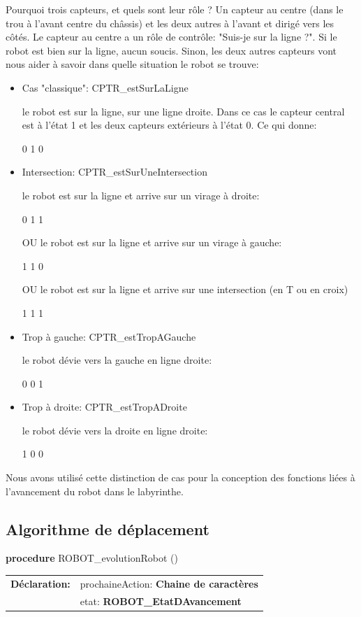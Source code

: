 \documentclass[a4paper,11pt]{article}
\begin{document}
Pourquoi trois capteurs, et quels sont leur rôle ?
Un capteur au centre (dans le trou à l'avant centre du châssis) et les deux autres à l'avant et dirigé vers les côtés.
Le capteur au centre a un rôle de contrôle: "Suis-je sur la ligne ?". Si le robot est bien sur la ligne, aucun soucis.
Sinon, les deux autres capteurs vont nous aider à savoir dans quelle situation le robot se trouve:
\begin{itemize}
    \item Cas "classique": CPTR\_estSurLaLigne
     
    le robot est sur la ligne, sur une ligne droite. Dans ce cas le capteur central est à l'état 1 et les deux capteurs extérieurs à l'état 0. Ce qui donne:

        0   1   0
    \item Intersection: CPTR\_estSurUneIntersection
    
    le robot est sur la ligne et arrive sur un virage à droite:
        
        0   1   1
    
    OU le robot est sur la ligne et arrive sur un virage à gauche:
    
        1   1   0
    
    OU le robot est sur la ligne et arrive sur une intersection (en T ou en croix)
    
        1   1   1
    \item Trop à gauche: CPTR\_estTropAGauche
    
    le robot dévie vers la gauche en ligne droite:
    
        0   0   1
    \item Trop à droite: CPTR\_estTropADroite
    
    le robot dévie vers la droite en ligne droite:
    
        1   0   0
\end{itemize}

Nous avons utilisé cette distinction de cas pour la conception des fonctions liées à l'avancement du robot dans le labyrinthe.

\subsection{Algorithme de déplacement}

\noindent\textbf{procedure} ROBOT\_evolutionRobot ()

\begin{tabular}{ll}
    \textbf{Déclaration:} & prochaineAction: \textbf{Chaine de caractères}\\
     & etat: \textbf{ROBOT\_EtatDAvancement}\\
\end{tabular}
\end{document}
